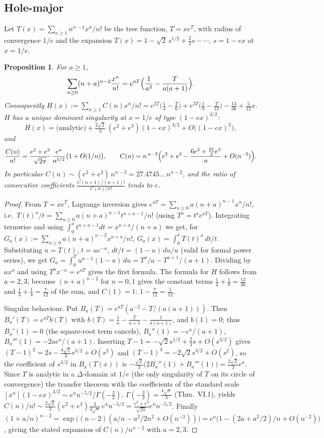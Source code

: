 \documentclass[11pt]{article}
\newtheorem{proposition}{Proposition}
\theoremstyle{definition}
\theoremstyle{remark}
\begin{document}
\subsection{Hole-major}
Let $T(x)=\sum_{n\ge1}n^{n-1}x^n/n!$ be the tree function, $T=xe^{T}$, with radius of convergence $1/e$ and the expansion
$T(x)=1-\sqrt2\,s^{1/2}+\tfrac23s-\cdots$, $s=1-ex$ at $x=1/e$.
\begin{proposition}\label{prop:holeasym}
For $a\ge1$,
\[
\sum_{n\ge0}(n+a)^{n-2}\frac{x^n}{n!}=e^{aT}\Bigl(\frac1{a^2}-\frac{T}{a(a+1)}\Bigr).
\]
Consequently $H(x):=\sum_{n\ge1}C(n)x^n/n!=e^{2T}\bigl(\tfrac14-\tfrac T6\bigr)+e^{3T}\bigl(\tfrac19-\tfrac T{12}\bigr)-\tfrac{13}{36}+\tfrac5{12}x$. $H$ has a unique
dominant singularity at $x=1/e$ of type $(1-ex)^{3/2}$:
\[
H(x)=\text{(analytic)}+\tfrac{2\sqrt2}{3}\,(e^2+e^3)(1-ex)^{3/2}+O\bigl((1-ex)^2\bigr),
\]
and
\[
\frac{C(n)}{n!}=\frac{e^2+e^3}{\sqrt{2\pi}}\,\frac{e^{n}}{n^{5/2}}\bigl(1+O(1/n)\bigr),\qquad
C(n)=n^{\,n-2}\Bigl(e^2+e^3-\frac{6e^2+\frac{21}2e^3}{n}+O(n^{-2})\Bigr).
\]
In particular $C(n)\sim(e^2+e^3)\,n^{n-2}=27.4745\ldots\,n^{n-2}$, and the ratio of consecutive coefficients $\frac{C(n+1)/(n+1)!}{C(n)/n!}$ tends to $e$.
\end{proposition}
\begin{proof}
From $T=xe^T$, Lagrange inversion gives $e^{aT}=\sum_{n\ge0}a(n+a)^{n-1}x^n/n!$, i.e.\ $T(t)^a/t=\sum_{n\ge0}a(n+a)^{n-1}t^{n+a-1}/n!$ (using $T^a=t^ae^{aT}$).
Integrating termwise and using $\int_0^xt^{n+a-1}dt=x^{n+a}/(n+a)$ we get, for $G_a(x):=\sum_{n\ge0}a(n+a)^{n-2}x^{n+a}/n!$,
$G_a(x)=\int_0^xT(t)^a\,dt/t$. Substituting $u=T(t)$, $t=ue^{-u}$, $dt/t=(1-u)\,du/u$ (valid for formal power series), we get
$G_a=\int_0^{T}u^{a-1}(1-u)\,du=T^a/a-T^{a+1}/(a+1)$. Dividing by $ax^a$ and using $T^ax^{-a}=e^{aT}$ gives the first formula. The formula for $H$ follows from $a=2,3$, because $(n+a)^{n-2}$ for $n=0,1$ gives the constant terms $\tfrac14+\tfrac19=\tfrac{13}{36}$ and
$\tfrac13+\tfrac14=\tfrac7{12}$ of the sum, and $C(1)=1$: $1-\tfrac7{12}=\tfrac5{12}$.

Singular behaviour. Put $B_a(T)=e^{aT}(a^{-2}-T/(a(a+1)))$. Then $B_a'(T)=e^{aT}b(T)$ with $b(T)=\tfrac1a-\tfrac T{a+1}-\tfrac1{a(a+1)}$, and $b(1)=0$; thus $B_a'(1)=0$ (the
square-root term cancels), $B_a''(1)=-e^a/(a+1)$, $B_a'''(1)=-2ae^a/(a+1)$. Inserting $T-1=-\sqrt2s^{1/2}+\tfrac23s+O(s^{3/2})$ gives
$(T-1)^2=2s-\tfrac{4\sqrt2}3s^{3/2}+O(s^2)$ and $(T-1)^3=-2\sqrt2s^{3/2}+O(s^2)$, so the coefficient of $s^{3/2}$ in $B_a(T(x))$ is
$-\tfrac{\sqrt2}{3}\bigl(2B_a''(1)+B_a'''(1)\bigr)=\tfrac{2\sqrt2}3e^a$. Since $T$ is analytic in a $\Delta$-domain at $1/e$ (the only singularity of $T$ on its circle of convergence) the transfer theorem
\cite[Thm.~VI.3 and Cor.~VI.1]{FS09} with the coefficients of the standard scale $[x^n](1-ex)^{3/2}\sim e^nn^{-5/2}/\Gamma(-\tfrac32)$, $\Gamma(-\tfrac32)=\tfrac{4\sqrt\pi}3$ (Thm.~VI.1), yields
$C(n)/n!\sim\tfrac{2\sqrt2}3(e^2+e^3)\tfrac3{4\sqrt\pi}\,e^nn^{-5/2}=\tfrac{e^2+e^3}{\sqrt{2\pi}}e^nn^{-5/2}$.
Finally $(1+a/n)^{n-2}=\exp\bigl((n-2)(a/n-a^2/2n^2+O(n^{-3}))\bigr)=e^a\bigl(1-(2a+a^2/2)/n+O(n^{-2})\bigr)$, giving the stated expansion of $C(n)/n^{n-2}$ with $a=2,3$.
\end{proof}
\end{document}
